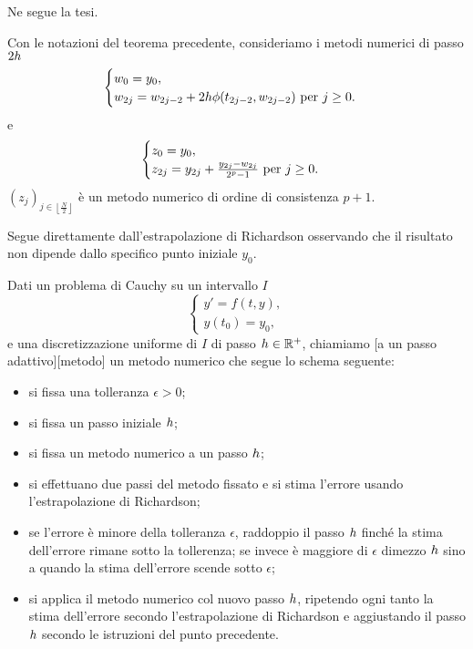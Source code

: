 \par Ne segue la tesi. \EndProof
\begin{Corollary}
	Con le notazioni del teorema precedente, consideriamo i metodi numerici di passo $2 h$
	\[
	\begin{cases}
		w_0 = y_0,\\
		w_{2j} = w_{2j - 2} + 2 h\phi(t_{2j - 2},w_{2j - 2})\text{ per }j \geq 0.
	\end{cases}
	\]
	e
	\[
	\begin{cases}
		z_0 = y_0,\\
		z_{2j} = y_{2j} + \frac{y_{2j} - w_{2j}}{2^p - 1}\text{ per }j \geq 0.
	\end{cases}
	\]
	$(z_j)_{j \in \left \lfloor \frac{N}{2} \right \rfloor}$ \`e un metodo numerico di ordine di consistenza $p + 1$.
\end{Corollary}
\Proof Segue direttamente dall'estrapolazione di Richardson osservando che il risultato non dipende dallo specifico punto iniziale $y_0$. \EndProof
\begin{Definition}
\label{MetodiNumericiPerEquazioniDifferenzialiOrdinarie_DefinizioneMetodoNumericoAUnPassoAdattivo}
	Dati un problema di Cauchy su un intervallo $I$
	\[
	\begin{cases}
		y' = f(t,y),\\
		y(t_0) = y_0,
	\end{cases}
	\]
	e una discretizzazione uniforme di $I$ di passo $h \in \mathbb{R}^+$, chiamiamo [a un passo adattivo][metodo] un metodo numerico che segue lo schema seguente:
	\begin{itemize}
		\item si fissa una tolleranza $\epsilon > 0$;
		\item si fissa un passo iniziale $h$;
		\item si fissa un metodo numerico a un passo $h$;
		\item si effettuano due passi del metodo fissato e si stima l'errore usando l'estrapolazione di Richardson;
		\item se l'errore \`e minore della tolleranza $\epsilon$, raddoppio il passo $h$ finch\'e la stima dell'errore rimane sotto la tollerenza; se invece \`e maggiore di $\epsilon$ dimezzo $h$ sino a quando la stima dell'errore scende sotto $\epsilon$;
		\item si applica il metodo numerico col nuovo passo $h$, ripetendo ogni tanto la stima dell'errore secondo l'estrapolazione di Richardson e aggiustando il passo $h$ secondo le istruzioni del punto precedente.
	\end{itemize}
\end{Definition}

